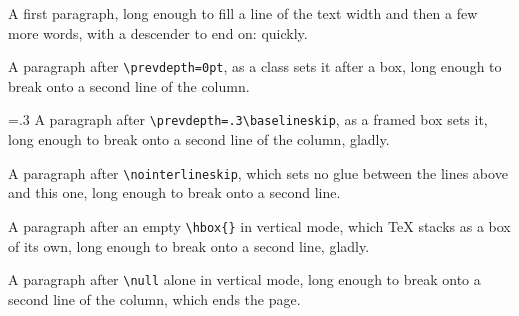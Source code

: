 \documentclass{article}
\begin{document}
A first paragraph, long enough to fill a line of the text width and then a
few more words, with a descender to end on: quickly.
\par\prevdepth=0pt
A paragraph after \verb|\prevdepth=0pt|, as a class sets it after a box, long
enough to break onto a second line of the column.
\par\prevdepth=.3\baselineskip
A paragraph after \verb|\prevdepth=.3\baselineskip|, as a framed box sets it,
long enough to break onto a second line of the column, gladly.
\par\nointerlineskip
A paragraph after \verb|\nointerlineskip|, which sets no glue between the
lines above and this one, long enough to break onto a second line.
\par\hbox{}
A paragraph after an empty \verb|\hbox{}| in vertical mode, which TeX stacks as
a box of its own, long enough to break onto a second line, gladly.

\null
A paragraph after \verb|\null| alone in vertical mode, long enough to break
onto a second line of the column, which ends the page.
\end{document}

